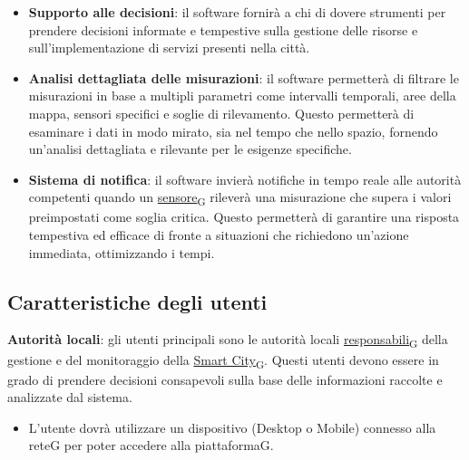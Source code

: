 \begin{itemize}
    \item \textbf{Supporto alle decisioni}: il software fornirà a chi di dovere strumenti per prendere decisioni informate e tempestive sulla gestione delle risorse e sull’implementazione di servizi presenti nella città.
    \item \textbf{Analisi dettagliata delle misurazioni}: il software permetterà di filtrare le misurazioni in base a multipli parametri come intervalli temporali, aree della mappa, sensori specifici e soglie di rilevamento. Questo permetterà di esaminare i dati in modo mirato, sia nel tempo che nello spazio, fornendo un’analisi dettagliata e rilevante per le esigenze specifiche.
    \item \textbf{Sistema di notifica}: il software invierà notifiche in tempo reale alle autorità competenti quando un \href{https://7last.github.io/docs/rtb/documentazione-interna/glossario\#sensore}{sensore\textsubscript{G}} rileverà una misurazione che supera i valori preimpostati come soglia critica. Questo permetterà di garantire una risposta tempestiva ed efficace di fronte a situazioni che richiedono un’azione immediata, ottimizzando i tempi.
\end{itemize}

\subsection{Caratteristiche degli utenti} %
\textbf{Autorità locali}: gli utenti principali sono le autorità locali \href{https://7last.github.io/docs/rtb/documentazione-interna/glossario\#responsabile}{responsabili\textsubscript{G}} della gestione e del monitoraggio della \href{https://7last.github.io/docs/rtb/documentazione-interna/glossario\#smart-city}{Smart City\textsubscript{G}}. Questi utenti devono essere in grado di prendere decisioni consapevoli sulla base delle informazioni raccolte e analizzate dal sistema.\\
\begin{itemize}
    \item L’utente dovrà utilizzare un dispositivo (Desktop o Mobile) connesso alla reteG per poter accedere alla piattaformaG.
\end{itemize}
